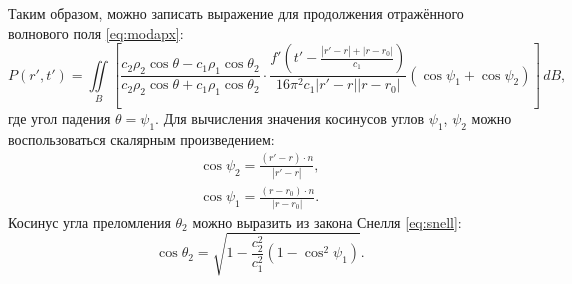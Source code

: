 \documentclass[a4paper, fontsize=14pt]{article}
\begin{document}
	Таким образом, можно записать выражение для продолжения отражённого волнового поля \eqref{eq:modapx}:
	\begin{equation}
		P(r',t') = \iint\limits_{B} \left[ \frac{c_2 \rho_2 \cos \theta - c_1 \rho_1 \cos \theta_2}{c_2 \rho_2 \cos \theta + c_1 \rho_1 \cos \theta_2} \cdot \frac{f'\left(t'-\frac{|r'-r|+|r-r_0|}{c_1}\right) }{16\pi^2c_1|r'-r||r-r_0|} (\cos \psi_1 + \cos \psi_2) \right] \,dB,
	\end{equation}
	где угол падения $\theta=\psi_1$.
	Для вычисления значения косинусов углов $\psi_1$, $\psi_2$ можно воспользоваться скалярным произведением:
	\begin{gather}
		\cos \psi_2=\frac{(r'-r)\cdot n }{|r'-r|}, \\
		\cos \psi_1 = \frac{(r-r_0)\cdot n }{|r-r_0|}.  \label{eq:cosincident}
	\end{gather}
	Косинус угла преломления $\theta_2$ можно выразить из закона Снелля \eqref{eq:snell}:
	\begin{equation}
		\cos \theta_2 =  \sqrt{1-\frac{c_2^2}{c_1^2}(1-\cos^2 \psi_1)}.
	\end{equation}
\end{document}

